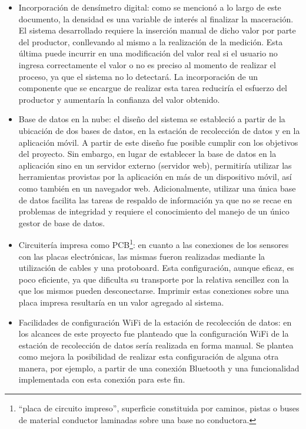 \begin{itemize}
    \item Incorporación de densímetro digital: como se mencionó a lo largo de este documento, la densidad es una variable de interés al finalizar la maceración. El sistema desarrollado requiere la inserción manual de dicho valor por parte del productor, conllevando al mismo a la realización de la medición. Esta última puede incurrir en una modificación del valor real si el usuario no ingresa correctamente el valor o no es preciso al momento de realizar el proceso, ya que el sistema no lo detectará. La incorporación de un componente que se encargue de realizar esta tarea reduciría el esfuerzo del productor y aumentaría la confianza del valor obtenido. 
    
    \item Base de datos en la nube: el diseño del sistema se estableció a partir de la ubicación de dos bases de datos, en la estación de recolección de datos y en la aplicación móvil. A partir de este diseño fue posible cumplir con los objetivos del proyecto. Sin embargo, en lugar de establecer la base de datos en la aplicación sino en un servidor externo (servidor web), permitiría utilizar las herramientas provistas por la aplicación en más de un dispositivo móvil, así como también en un navegador web. Adicionalmente, utilizar una única base de datos facilita las tareas de respaldo de información ya que no se recae en problemas de integridad y requiere el conocimiento del manejo de un único gestor de base de datos.
    
    \item Circuitería impresa como PCB\footnote{“placa de circuito impreso”, superficie constituida por caminos, pistas o buses de material conductor laminadas sobre una base no conductora.}: en cuanto a las conexiones de los sensores con las placas electrónicas, las mismas fueron realizadas mediante la utilización de cables y una protoboard. Esta configuración, aunque eficaz, es poco eficiente, ya que dificulta su transporte por la relativa sencillez con la que los mismos pueden desconectarse. Imprimir estas conexiones sobre una placa impresa resultaría en un valor agregado al sistema.
    
    \item Facilidades de configuración WiFi\textsuperscript{\textregistered} de la estación de recolección de datos: en los alcances de este proyecto fue planteado que la configuración WiFi\textsuperscript{\textregistered} de la estación de recolección de datos sería realizada en forma manual. Se plantea como mejora la posibilidad de realizar esta configuración de alguna otra manera, por ejemplo, a partir de una conexión Bluetooth\textsuperscript{\textregistered} y una funcionalidad implementada con esta conexión para este fin.


\end{itemize}
